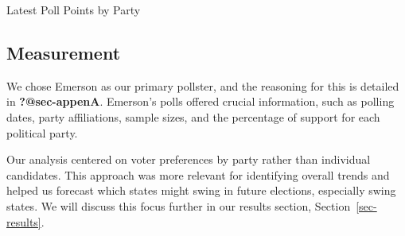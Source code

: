\documentclass[
  letterpaper,
  DIV=11,
  numbers=noendperiod]{scrartcl}
\begin{document}
\begin{figure}


\caption{\label{fig-predictors-pct-summary-2}}

\end{figure}%

Latest Poll Points by Party

\subsection{Measurement}\label{measurement}

We chose Emerson as our primary pollster, and the reasoning for this is
detailed in \textbf{?@sec-appenA}. Emerson's polls offered crucial
information, such as polling dates, party affiliations, sample sizes,
and the percentage of support for each political party.

Our analysis centered on voter preferences by party rather than
individual candidates. This approach was more relevant for identifying
overall trends and helped us forecast which states might swing in future
elections, especially swing states. We will discuss this focus further
in our results section, Section~\ref{sec-results}.
\end{document}
